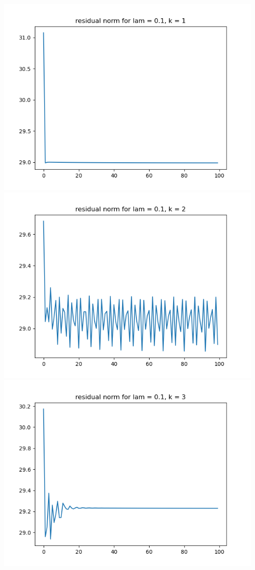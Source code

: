 \documentclass{article}
\begin{document}
\begin{enumerate}
\begin{enumerate}
		\begin{center}
			\includegraphics[scale=.3]{hw7p1 residual norm for lamcount = 1, k = 1}
			\includegraphics[scale=.3]{hw7p1 residual norm for lamcount = 1, k = 2}
			\includegraphics[scale=.3]{hw7p1 residual norm for lamcount = 1, k = 3}

\end{center}
\end{enumerate}
\end{enumerate}
\end{document}
